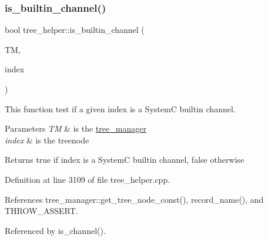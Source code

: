 \subsubsection{\texorpdfstring{is\+\_\+builtin\+\_\+channel()}{is\_builtin\_channel()}}
{\footnotesize\ttfamily bool tree\+\_\+helper\+::is\+\_\+builtin\+\_\+channel (\begin{DoxyParamCaption}\item[{const \hyperlink{tree__manager_8hpp_a792e3f1f892d7d997a8d8a4a12e39346}{tree\+\_\+manager\+Const\+Ref} \&}]{TM,  }\item[{const unsigned int}]{index }\end{DoxyParamCaption})\hspace{0.3cm}{\ttfamily [static]}}



This function test if a given index is a SystemC builtin channel. 


\begin{DoxyParams}{Parameters}
{\em TM} & is the \hyperlink{classtree__manager}{tree\+\_\+manager} \\
\hline
{\em index} & is the treenode \\
\hline
\end{DoxyParams}
\begin{DoxyReturn}{Returns}
true if index is a SystemC builtin channel, false otherwise 
\end{DoxyReturn}


Definition at line 3109 of file tree\+\_\+helper.\+cpp.



References tree\+\_\+manager\+::get\+\_\+tree\+\_\+node\+\_\+const(), record\+\_\+name(), and T\+H\+R\+O\+W\+\_\+\+A\+S\+S\+E\+RT.



Referenced by is\+\_\+channel().


